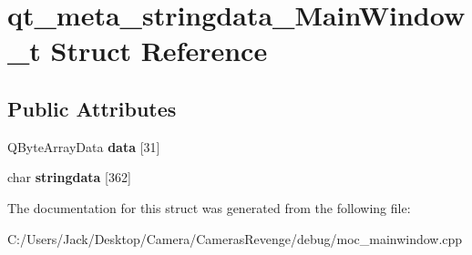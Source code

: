 \hypertarget{structqt__meta__stringdata___main_window__t}{\section{qt\+\_\+meta\+\_\+stringdata\+\_\+\+Main\+Window\+\_\+t Struct Reference}
\label{structqt__meta__stringdata___main_window__t}
}
\subsection*{Public Attributes}
\begin{DoxyCompactItemize}
\item 
\hypertarget{structqt__meta__stringdata___main_window__t_ad4b6c529acc4e8470c62dbbb88507600}{Q\+Byte\+Array\+Data {\bfseries data} \mbox{[}31\mbox{]}}\label{structqt__meta__stringdata___main_window__t_ad4b6c529acc4e8470c62dbbb88507600}

\item 
\hypertarget{structqt__meta__stringdata___main_window__t_aab972178427e38ce731e25e05ea35b91}{char {\bfseries stringdata} \mbox{[}362\mbox{]}}\label{structqt__meta__stringdata___main_window__t_aab972178427e38ce731e25e05ea35b91}

\end{DoxyCompactItemize}


The documentation for this struct was generated from the following file\+:\begin{DoxyCompactItemize}
\item 
C\+:/\+Users/\+Jack/\+Desktop/\+Camera/\+Cameras\+Revenge/debug/moc\+\_\+mainwindow.\+cpp\end{DoxyCompactItemize}
